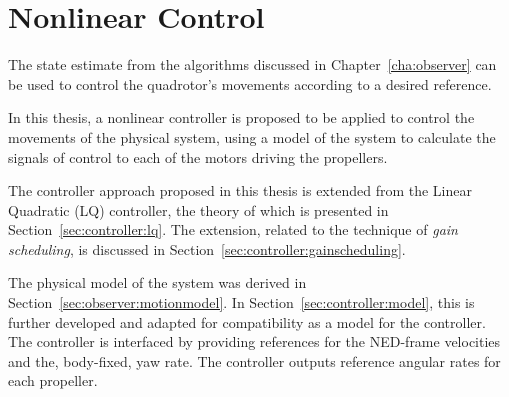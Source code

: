 \chapter{Nonlinear Control}
\label{cha:controller}
    The state estimate from the algorithms discussed in Chapter~\ref{cha:observer}
    can be used to control the quadrotor's movements according to a desired
    reference.

    In this thesis, a nonlinear controller is proposed to be applied to
    control the movements of the physical system, using a model
    of the system to calculate the signals of control to each
    of the motors driving the propellers.

    The controller approach proposed in this thesis is extended from the Linear Quadratic (LQ)
    controller, the theory of which is presented in Section~\ref{sec:controller:lq}.
    The extension, related to the technique of \textit{gain scheduling}, is discussed
    in Section~\ref{sec:controller:gainscheduling}.

    The physical model of the system was derived in Section~\ref{sec:observer:motionmodel}.
    In Section~\ref{sec:controller:model}, this is further developed
    and adapted for compatibility as a model for the controller.
    The controller is interfaced by providing references
    for the NED-frame velocities and the, body-fixed, yaw rate.
    The controller outputs reference angular rates for each propeller.

    
    
    \pagebreak
    
